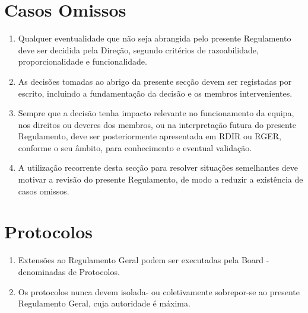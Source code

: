 \section{Casos Omissos}
\begin{enumerate}
  \item Qualquer eventualidade que não seja abrangida pelo presente Regulamento deve ser decidida pela Direção, segundo critérios de razoabilidade, proporcionalidade e funcionalidade.
  \item As decisões tomadas ao abrigo da presente secção devem ser registadas por escrito, incluindo a fundamentação da decisão e os membros intervenientes.
  \item Sempre que a decisão tenha impacto relevante no funcionamento da equipa, nos direitos ou deveres dos membros, ou na interpretação futura do presente Regulamento, deve ser posteriormente apresentada em RDIR ou RGER, conforme o seu âmbito, para conhecimento e eventual validação.
  \item A utilização recorrente desta secção para resolver situações semelhantes deve motivar a revisão do presente Regulamento, de modo a reduzir a existência de casos omissos.
\end{enumerate}

\section{Protocolos}
\begin{enumerate}
  \item Extensões ao Regulamento Geral podem ser executadas pela Board - denominadas de Protocolos.
  \item Os protocolos nunca devem isolada- ou coletivamente sobrepor-se ao presente Regulamento Geral, cuja autoridade é máxima.
\end{enumerate}
